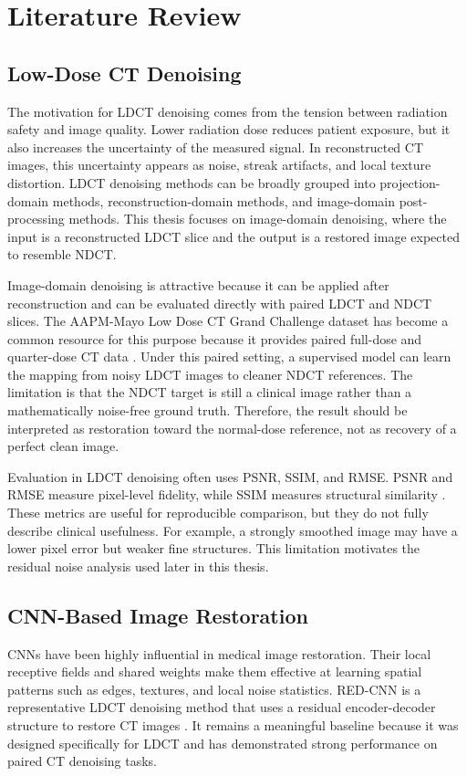 \chapter{Literature Review}

\section{Low-Dose CT Denoising}

The motivation for LDCT denoising comes from the tension between radiation safety and image quality. Lower radiation dose reduces patient exposure, but it also increases the uncertainty of the measured signal. In reconstructed CT images, this uncertainty appears as noise, streak artifacts, and local texture distortion. LDCT denoising methods can be broadly grouped into projection-domain methods, reconstruction-domain methods, and image-domain post-processing methods. This thesis focuses on image-domain denoising, where the input is a reconstructed LDCT slice and the output is a restored image expected to resemble NDCT.

Image-domain denoising is attractive because it can be applied after reconstruction and can be evaluated directly with paired LDCT and NDCT slices. The AAPM-Mayo Low Dose CT Grand Challenge dataset has become a common resource for this purpose because it provides paired full-dose and quarter-dose CT data \cite{aapm}. Under this paired setting, a supervised model can learn the mapping from noisy LDCT images to cleaner NDCT references. The limitation is that the NDCT target is still a clinical image rather than a mathematically noise-free ground truth. Therefore, the result should be interpreted as restoration toward the normal-dose reference, not as recovery of a perfect clean image.

Evaluation in LDCT denoising often uses PSNR, SSIM, and RMSE. PSNR and RMSE measure pixel-level fidelity, while SSIM measures structural similarity \cite{ssim}. These metrics are useful for reproducible comparison, but they do not fully describe clinical usefulness. For example, a strongly smoothed image may have a lower pixel error but weaker fine structures. This limitation motivates the residual noise analysis used later in this thesis.

\section{CNN-Based Image Restoration}

CNNs have been highly influential in medical image restoration. Their local receptive fields and shared weights make them effective at learning spatial patterns such as edges, textures, and local noise statistics. RED-CNN is a representative LDCT denoising method that uses a residual encoder-decoder structure to restore CT images \cite{redcnn}. It remains a meaningful baseline because it was designed specifically for LDCT and has demonstrated strong performance on paired CT denoising tasks.

